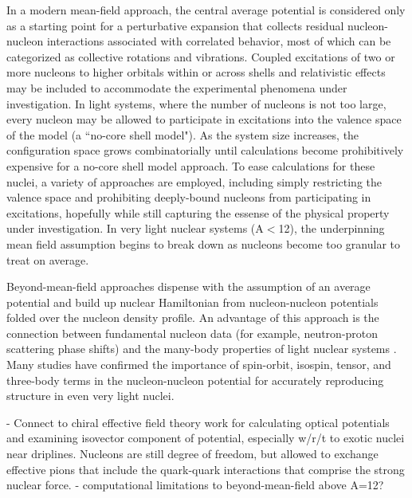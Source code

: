 In a modern mean-field approach, the central average potential is considered
only as a starting point for a perturbative
expansion that collects residual nucleon-nucleon interactions associated with
correlated behavior, most of which can be categorized as collective rotations
and vibrations. Coupled excitations of
two or more nucleons to higher orbitals within or across shells and relativistic effects may 
be included to accommodate the experimental phenomena under investigation.
In light systems, where the number of nucleons is not too large, every nucleon
may be allowed to participate in excitations into the valence space of the model
(a ``no-core shell model"). As the system size increases, the configuration space grows
combinatorially until calculations become prohibitively expensive for a no-core
shell model approach. To ease calculations for these nuclei, a variety of approaches
are employed, including simply restricting the valence space and prohibiting deeply-bound 
nucleons from participating in excitations, hopefully while still capturing the
essense of the physical property under investigation. In very light nuclear
systems (A$<$12), the underpinning
mean field assumption begins to break down as nucleons become too granular to treat on average.


Beyond-mean-field approaches dispense with the assumption of an average
potential and build up nuclear Hamiltonian from nucleon-nucleon potentials
folded over the nucleon density profile. An advantage
of this approach is the connection between fundamental nucleon data
(for example, neutron-proton scattering phase shifts) and the many-body
properties of light nuclear systems \cite{AV18}. Many studies have
confirmed the importance of spin-orbit, isospin, tensor, and three-body terms
in the nucleon-nucleon potential for accurately reproducing structure in even
very light nuclei. 

- Connect to chiral effective field theory work for calculating optical potentials
and examining isovector component of potential, especially w/r/t to exotic
nuclei near driplines. Nucleons are still degree of freedom, but allowed to exchange effective 
pions that include the quark-quark interactions that comprise the strong nuclear force.
- computational limitations to beyond-mean-field above A=12?

